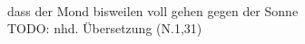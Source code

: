 \begin{exe}
\ex \label{ex:N8884} \gll {}          \\
{dass} {der} {Mond} {bisweilen} {voll} {gehen} {gegen} {der} {Sonne} {}\\
\glt TODO: nhd. Übersetzung (N.1,31)
\end{exe}

